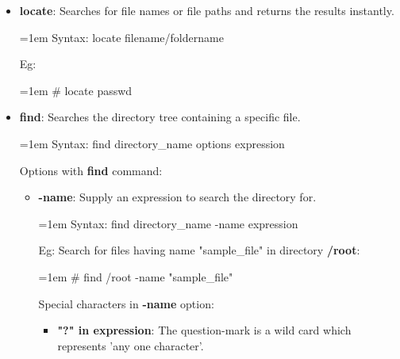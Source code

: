 \setlength{\columnsep}{3pt}
\begin{flushleft}
	
	\begin{itemize}
		\item \textbf{locate}: Searches for file names or file paths and returns the results
		instantly.
		\bigskip
		\begin{tcolorbox}[breakable,notitle,boxrule=-0pt,colback=pink,colframe=pink]
			\color{black}
			\font=1em
			Syntax: locate filename/foldername
			\font=4pt
		\end{tcolorbox}
		Eg:
		\begin{tcolorbox}[breakable,notitle,boxrule=-0pt,colback=black,colframe=black]
			\color{green}
			\font=1em
			\# locate passwd
			\font=4pt
		\end{tcolorbox}		
		\bigskip
		\bigskip
		\item \textbf{find}: Searches the directory tree containing a specific file.
		\bigskip
		\begin{tcolorbox}[breakable,notitle,boxrule=-0pt,colback=pink,colframe=pink]
			\color{black}
			\font=1em
			Syntax: find directory\_name options expression
			\font=4pt
		\end{tcolorbox}
		Options with \textbf{find} command:
		\bigskip
		\begin{itemize}
			\item \textbf{-name}: Supply an expression to search the directory for.
			\bigskip
			\begin{tcolorbox}[breakable,notitle,boxrule=-0pt,colback=pink,colframe=pink]
				\color{black}
				\font=1em
				Syntax: find directory\_name -name expression
				\font=4pt
			\end{tcolorbox}
			Eg: Search for files having name "sample\_file" in directory \textbf{/root}:
			\bigskip
			\begin{tcolorbox}[breakable,notitle,boxrule=-0pt,colback=black,colframe=black]
				\color{green}
				\font=1em
				\# find /root -name "sample\_file"
				\font=4pt
			\end{tcolorbox}		
			Special characters in \textbf{-name} option:
			\begin{itemize}
				\item \textbf{"?" in expression}: The question-mark is a wild card which represents 'any one character'.
				\bigskip
				\begin{tcolorbox}[breakable,notitle,boxrule=-0pt,colback=black,colframe=black]

\end{tcolorbox}
\end{itemize}
\end{itemize}
\end{itemize}
\end{flushleft}
